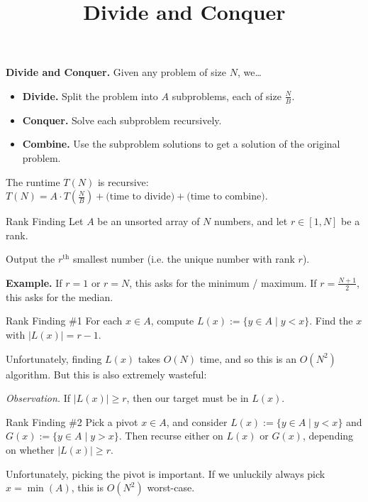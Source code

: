 \title{Divide and Conquer}



\textbf{Divide and Conquer.} Given any problem of size $N$, we\dots
\begin{itemize}
    \item \textbf{Divide.} Split the problem into $A$ subproblems, each of size $\frac{N}{B}$.
    \item \textbf{Conquer.} Solve each subproblem recursively.
    \item \textbf{Combine.} Use the subproblem solutions to get a solution of the original problem.
\end{itemize}
The runtime $T(N)$ is recursive: $T(N) = A \cdot T\left(\frac{N}{B}\right) + \text{(time to divide)} + \text{(time to combine)}$.

\begin{problem}{Rank Finding}
    Let $A$ be an unsorted array of $N$ numbers, and let $r \in [1, N]$ be a rank.
    
    Output the $r^{\text{th}}$ smallest number (i.e. the unique number with rank $r$).
\end{problem}

\textbf{Example.} If $r = 1$ or $r = N$, this asks for the minimum / maximum.  If $r = \frac{N + 1}{2}$, this asks for the median.

\begin{solution}{Rank Finding \#1}
    For each $x \in A$, compute $L(x) := \{ y \in A \mid y < x\}$.  Find the $x$ with $|L(x)| = r - 1$.
\end{solution}

Unfortunately, finding $L(x)$ takes $O(N)$ time, and so this is an $O(N^2)$ algorithm.  But this is also extremely wasteful:

\begin{boxed-text}[32em]
    \emph{Observation.} If $|L(x)| \geq r$, then our target must be in $L(x)$.
\end{boxed-text}

\begin{solution}{Rank Finding \#2}
    Pick a pivot $x \in A$, and consider $L(x) := \{ y \in A \mid y < x\}$ and $G(x) := \{ y \in A \mid y > x \}$.  Then recurse either on $L(x)$ or $G(x)$, depending on whether $|L(x)| \geq r$.
\end{solution}

Unfortunately, picking the pivot is important.  If we unluckily always pick $x = \min(A)$, this is $O(N^2)$ worst-case.

